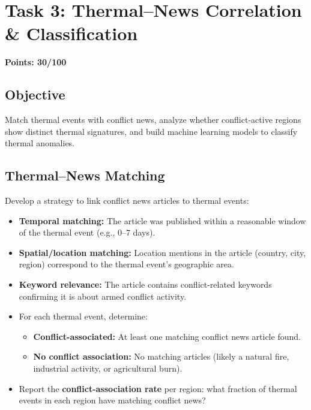 \documentclass[11pt]{article}
\begin{document}
\section{Task 3: Thermal--News Correlation \& Classification}
\noindent\textbf{Points: 30/100}

\subsection{Objective}
Match thermal events with conflict news, analyze whether conflict-active regions show distinct thermal signatures, and build machine learning models to classify thermal anomalies.

\subsection{Thermal--News Matching}
Develop a strategy to link conflict news articles to thermal events:
\begin{itemize}
  \item \textbf{Temporal matching:} The article was published within a reasonable window of the thermal event (e.g., 0--7 days).
  \item \textbf{Spatial/location matching:} Location mentions in the article (country, city, region) correspond to the thermal event's geographic area.
  \item \textbf{Keyword relevance:} The article contains conflict-related keywords confirming it is about armed conflict activity.
  \item For each thermal event, determine:
  \begin{itemize}
    \item \textbf{Conflict-associated:} At least one matching conflict news article found.
    \item \textbf{No conflict association:} No matching articles (likely a natural fire, industrial activity, or agricultural burn).
  \end{itemize}
  \item Report the \textbf{conflict-association rate} per region: what fraction of thermal events in each region have matching conflict news?
\end{itemize}
\end{document}
